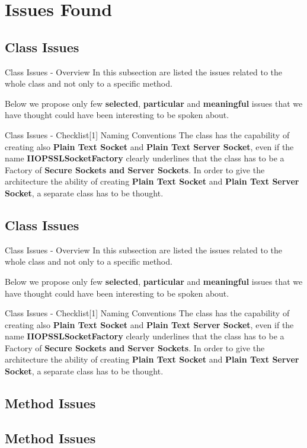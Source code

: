 \documentclass{../common/latex_classes/pdf_presentation}
\begin{document}
	\section{Issues Found}
	
	\subsection{Class Issues}
	
	\begin{frame}{Class Issues - Overview}
		In this subsection are listed the issues related to the whole class and not only to a specific method. \par Below we propose only few \textbf{selected}, \textbf{particular} and \textbf{meaningful} issues that we have thought could have been interesting to be spoken about.
	\end{frame}
	\begin{frame}{Class Issues - Checklist[1] Naming Conventions}
		The class has the capability of creating also \textbf{Plain Text Socket} and \textbf{Plain Text Server Socket}, even if the name \textbf{IIOPSSLSocketFactory} clearly underlines that the class has to be a Factory of \textbf{Secure Sockets and Server Sockets}. In order to give the architecture the ability of creating \textbf{Plain Text Socket} and \textbf{Plain Text Server Socket}, a separate class has to be thought.
	\end{frame}

	\subsection{Class Issues}
	
	\begin{frame}{Class Issues - Overview}
		In this subsection are listed the issues related to the whole class and not only to a specific method. \par Below we propose only few \textbf{selected}, \textbf{particular} and \textbf{meaningful} issues that we have thought could have been interesting to be spoken about.
	\end{frame}
	\begin{frame}{Class Issues - Checklist[1] Naming Conventions}
		The class has the capability of creating also \textbf{Plain Text Socket} and \textbf{Plain Text Server Socket}, even if the name \textbf{IIOPSSLSocketFactory} clearly underlines that the class has to be a Factory of \textbf{Secure Sockets and Server Sockets}. In order to give the architecture the ability of creating \textbf{Plain Text Socket} and \textbf{Plain Text Server Socket}, a separate class has to be thought.
	\end{frame}
	
	\subsection{Method Issues}
	
	\subsection{Method Issues}
	
\end{document}
